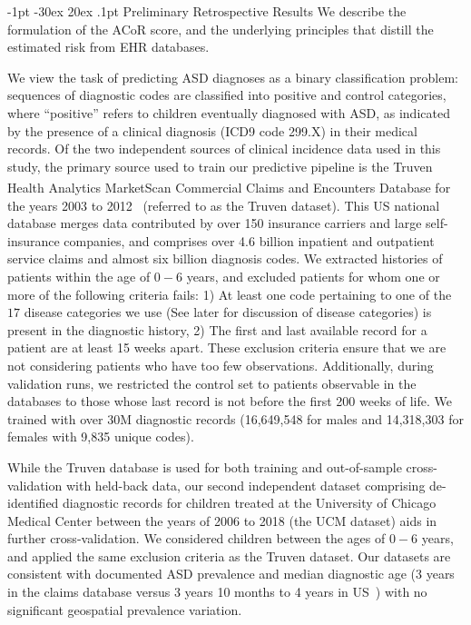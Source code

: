 \documentclass[onecolumn, compsoc,11pt]{IEEEtran}
\makeatletter
\renewcommand\section{\@startsection {section}{1}{\z@}%
                                   {-1pt \@plus -30ex \@minus 20ex}%
                                   {.1pt}%
                                   {\large\bfseries\scshape}}
\def\ZERO{ACoR\xspace}
\makeatother
\begin{document}
\section{Preliminary Retrospective Results}
We describe the formulation of the \ZERO score, and the underlying principles that distill the estimated risk from EHR databases.

We view the task of predicting  ASD diagnoses   as a binary classification problem: sequences of diagnostic codes are classified into positive and control categories, where ``positive'' refers to children eventually diagnosed with ASD, as indicated by the presence of a clinical diagnosis (ICD9 code 299.X) in their medical records. Of the two independent sources of clinical incidence data used in this study,  the primary source used to train our predictive pipeline  is the Truven Health Analytics MarketScan\textsuperscript{\textregistered} Commercial Claims and Encounters Database for the years 2003 to 2012~\cite{hansen2017truven} (referred to  as the Truven dataset). This US national database merges  data contributed by over 150 insurance carriers and large self-insurance companies,  and comprises over  4.6 billion inpatient and outpatient service claims and  almost six billion diagnosis codes. We extracted histories of patients within the age of $0-6$ years, and excluded  patients for whom one or more of the following criteria fails:  1) At least one code pertaining to one of the $17$ disease categories we use (See later for discussion of disease categories) is present in the diagnostic history, 2) The first and last available record for a patient are  at least 15 weeks apart. These exclusion criteria ensure that we are not considering patients who have too few observations. Additionally, during validation runs,  we restricted the control set to patients observable in the databases to those whose last record is not before the first 200 weeks of life. We trained with over  30M diagnostic records (16,649,548 for males and  14,318,303  for females with 9,835 unique  codes).

While the Truven database is used for both training and out-of-sample cross-validation with held-back  data, our second independent dataset  comprising de-identified diagnostic records for children treated at the University of Chicago Medical Center between the years of 2006 to 2018 (the UCM dataset) aids in further cross-validation. We considered children between the ages of $0-6$ years, and  applied the same exclusion criteria as the Truven dataset. 
Our datasets are consistent with documented ASD prevalence and median diagnostic age (3 years in the claims database  versus 3 years 10 months to 4 years  in US~\cite{pmid29701730}) with no significant geospatial prevalence variation.
\end{document}
